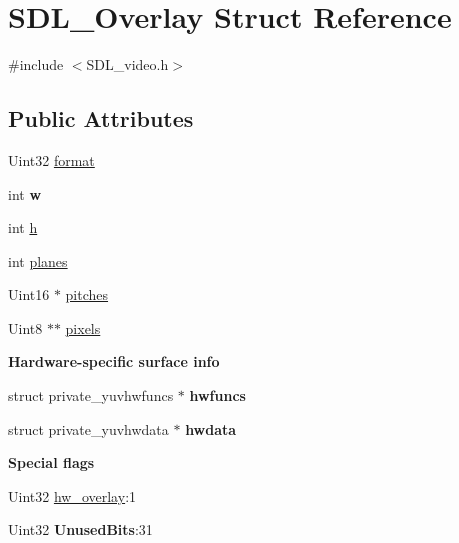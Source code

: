 \hypertarget{structSDL__Overlay}{\section{S\+D\+L\+\_\+\+Overlay Struct Reference}
\label{structSDL__Overlay}
}


{\ttfamily \#include $<$S\+D\+L\+\_\+video.\+h$>$}

\subsection*{Public Attributes}
\begin{DoxyCompactItemize}
\item 
Uint32 \hyperlink{structSDL__Overlay_a421f873d1ffc5530c1f9d4b49be75d4e}{format}
\item 
\hypertarget{structSDL__Overlay_a8a73fe76717c183d52dd67a6981fd84d}{int {\bfseries w}}\label{structSDL__Overlay_a8a73fe76717c183d52dd67a6981fd84d}

\item 
int \hyperlink{structSDL__Overlay_af1402a7a7cd8ba2816ddc7542c9d3e67}{h}
\item 
int \hyperlink{structSDL__Overlay_ab91d676ef6310197aa189c469be3d50a}{planes}
\item 
Uint16 $\ast$ \hyperlink{structSDL__Overlay_ad88bb773013ff535c647af38760c69e8}{pitches}
\item 
Uint8 $\ast$$\ast$ \hyperlink{structSDL__Overlay_a782b8904e618e8a1c2c8299c3994ec8f}{pixels}
\end{DoxyCompactItemize}
\begin{Indent}{\bf Hardware-\/specific surface info}\par
\begin{DoxyCompactItemize}
\item 
\hypertarget{structSDL__Overlay_aba6df163c475c57ba729bd9b86f87963}{struct private\+\_\+yuvhwfuncs $\ast$ {\bfseries hwfuncs}}\label{structSDL__Overlay_aba6df163c475c57ba729bd9b86f87963}

\item 
\hypertarget{structSDL__Overlay_acc40482a067d5c106747dab61bcee3c4}{struct private\+\_\+yuvhwdata $\ast$ {\bfseries hwdata}}\label{structSDL__Overlay_acc40482a067d5c106747dab61bcee3c4}

\end{DoxyCompactItemize}
\end{Indent}
\begin{Indent}{\bf Special flags}\par
\begin{DoxyCompactItemize}
\item 
Uint32 \hyperlink{structSDL__Overlay_a3c24f3b1805074deb9ce6ef5b14f70dc}{hw\+\_\+overlay}\+:1
\item 
\hypertarget{structSDL__Overlay_a3dff6185e5d7cba5455b17cbf96d23ed}{Uint32 {\bfseries Unused\+Bits}\+:31}\label{structSDL__Overlay_a3dff6185e5d7cba5455b17cbf96d23ed}

\end{DoxyCompactItemize}
\end{Indent}


